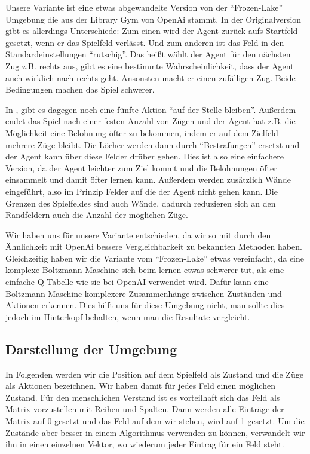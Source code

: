 Unsere Variante ist eine etwas abgewandelte Version von der ``Frozen-Lake'' Umgebung die aus der Library Gym von OpenAi stammt. In der Originalversion gibt es allerdings Unterschiede: Zum einen wird der Agent zurück aufs Startfeld gesetzt, wenn er das Spielfeld verlässt. Und zum anderen ist das Feld in den Standardeinstellungen ``rutschig''. Das heißt wählt der Agent für den nächsten Zug z.B. rechts aus, gibt es eine bestimmte Wahrscheinlichkeit, dass der Agent auch wirklich nach rechts geht. Ansonsten macht er einen zufälligen Zug. Beide Bedingungen machen das Spiel schwerer.

In \citep{crawford2019reinforcement}, gibt es dagegen noch eine fünfte Aktion ``auf der Stelle bleiben''. Außerdem endet das Spiel nach einer festen Anzahl von Zügen und der Agent hat z.B. die Möglichkeit eine Belohnung öfter zu bekommen, indem er auf dem Zielfeld mehrere Züge bleibt. Die Löcher werden dann durch ``Bestrafungen'' ersetzt und der Agent kann über diese Felder drüber gehen. Dies ist also eine einfachere Version, da der Agent leichter zum Ziel kommt und die Belohnungen öfter einsammelt und damit öfter lernen kann. Außerdem werden zusätzlich Wände eingeführt, also im Prinzip Felder auf die der Agent nicht gehen kann. Die Grenzen des Spielfeldes sind auch Wände, dadurch reduzieren sich an den Randfeldern auch die Anzahl der möglichen Züge.

Wir haben uns für unsere Variante entschieden, da wir so mit durch den Ähnlichkeit mit OpenAi bessere Vergleichbarkeit zu bekannten Methoden haben. Gleichzeitig haben wir die Variante vom ``Frozen-Lake'' etwas vereinfacht, da eine komplexe Boltzmann-Maschine sich beim lernen etwas schwerer tut, als eine einfache Q-Tabelle wie sie bei OpenAI verwendet wird. Dafür kann eine Boltzmann-Maschine komplexere Zusammenhänge zwischen Zuständen und Aktionen erkennen. Dies hilft uns für diese Umgebung nicht, man sollte dies jedoch im Hinterkopf behalten, wenn man die Resultate vergleicht.

\subsection{Darstellung der Umgebung}
\label{subsec:darstellung}

In Folgenden werden wir die Position auf dem Spielfeld als Zustand und die Züge als Aktionen bezeichnen. Wir haben damit für jedes Feld einen möglichen Zustand. Für den menschlichen Verstand ist es vorteilhaft sich das Feld als Matrix vorzustellen mit Reihen und Spalten. Dann werden alle Einträge der Matrix auf 0 gesetzt und das Feld auf dem wir stehen, wird auf 1 gesetzt. Um die Zustände aber besser in einem Algorithmus verwenden zu können, verwandelt wir ihn in einen einzelnen Vektor, wo wiederum jeder Eintrag für ein Feld steht.


